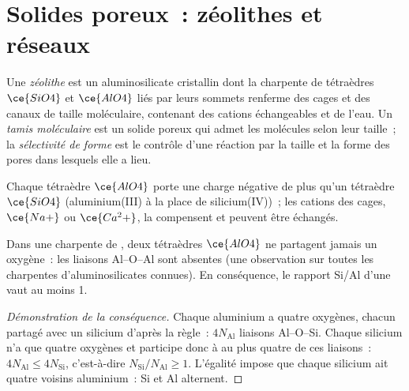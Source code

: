 \section{Solides poreux~: zéolithes et réseaux}

\begin{definition}[Zéolithes]\label{def:b3:inorganic-materials:zeolite}
Une \emph{zéolithe} est un aluminosilicate cristallin dont la
charpente de tétraèdres $\ce{SiO4}$ et $\ce{AlO4}$ liés par leurs sommets renferme des cages et des
canaux de taille moléculaire, contenant des cations échangeables et de
l'eau. Un \emph{tamis moléculaire} est un solide poreux qui
admet les molécules selon leur taille~; la \emph{sélectivité de forme}
est le contrôle d'une réaction par la taille et la forme des pores dans
lesquels elle a lieu.
\end{definition}

Chaque tétraèdre $\ce{AlO4}$ porte une charge négative de plus qu'un tétraèdre $\ce{SiO4}$
(aluminium(III) à la place de silicium(IV))~; les cations des cages, $\ce{Na+}$ ou $\ce{Ca^2+}$,
la compensent et peuvent être échangés.

\begin{proposition}\label{prop:b3:inorganic-materials:lowenstein}
Dans une charpente de , deux tétraèdres $\ce{AlO4}$ ne partagent jamais un oxygène~: les liaisons Al--O--Al
sont absentes (une observation sur toutes les charpentes d'aluminosilicates
connues). En conséquence, le rapport Si/Al d'une  vaut au moins 1.
\end{proposition}

\begin{proof}[Démonstration de la conséquence]
Chaque aluminium a quatre oxygènes, chacun partagé avec un silicium d'après la règle~:
$4N_{\mathrm{Al}}$ liaisons Al--O--Si. Chaque silicium n'a que quatre oxygènes et participe donc à
au plus quatre de ces liaisons~: $4N_{\mathrm{Al}} \le 4N_{\mathrm{Si}}$, c'est-à-dire $N_{\mathrm{Si}}/N_{\mathrm{Al}} \ge 1$. L'égalité impose que chaque
silicium ait quatre voisins aluminium~: Si et Al alternent.
\end{proof}

